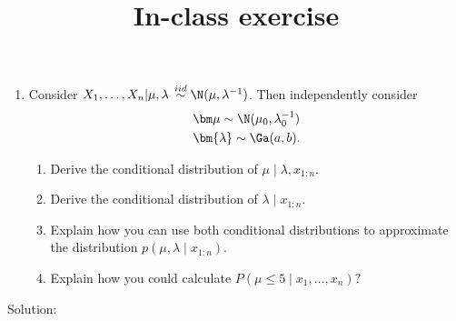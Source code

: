 \documentclass[12pt]{article}
\title{In-class exercise}
\author{}
\date{}
\begin{document}
\maketitle

\begin{enumerate}
\item Consider
$X_1,\ldots,X_n|\mu,\lambda\,\stackrel{iid}{\sim} \N(\mu,\lambda^{-1})$.
Then independently consider
\begin{align*}
& \bm\mu \sim \N(\mu_0,\lambda_0^{-1})\\
& \bm{\lambda} \sim \Ga(a,b).
\end{align*}
\begin{enumerate}
\item Derive the conditional distribution of $\mu \mid \lambda, x_{1:n}.$
\item Derive the conditional distribution of $\lambda \mid  x_{1:n}.$
\item Explain how you can use both conditional distributions to approximate the distribution $p(\mu, \lambda \mid x_{1:n}).$
\item Explain how you could calculate $P(\mu \leq 5 \mid x_1, \ldots, x_n)?$
\end{enumerate}
\end{enumerate}

Solution: 
\end{document}
